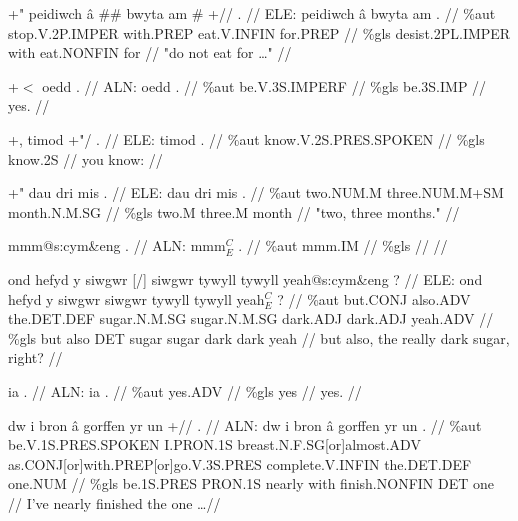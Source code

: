 \documentclass[a4paper,10pt]{article}
\begin{document}
\ex
\begingl[lingstyle=gergl]
\glchat +" peidiwch â \#\# bwyta am \# +// . //
\glsurface ELE:  peidiwch â bwyta am .  //
\glauto \%aut  stop{\scriptsize .V.2P.IMPER} with{\scriptsize .PREP} eat{\scriptsize .V.INFIN} for{\scriptsize .PREP}   //
\glmanual \%gls  desist{\scriptsize .2PL.IMPER} with eat{\scriptsize .NONFIN} for   //
\gleng "do not eat for \dots " //
\endgl
\xe

\ex
\begingl[lingstyle=gergl]
\glchat +$<$ oedd . //
\glsurface ALN:  oedd .  //
\glauto \%aut  be{\scriptsize .V.3S.IMPERF}   //
\glmanual \%gls  be{\scriptsize .3S.IMP}   //
\gleng yes. //
\endgl
\xe

\ex
\begingl[lingstyle=gergl]
\glchat +, timod +"/ . //
\glsurface ELE:  timod .  //
\glauto \%aut  know{\scriptsize .V.2S.PRES.SPOKEN}   //
\glmanual \%gls  know{\scriptsize .2S}   //
\gleng you know: //
\endgl
\xe

\ex
\begingl[lingstyle=gergl]
\glchat +" dau dri mis . //
\glsurface ELE:  dau dri mis .  //
\glauto \%aut  two{\scriptsize .NUM.M} three{\scriptsize .NUM.M+SM} month{\scriptsize .N.M.SG}   //
\glmanual \%gls  two{\scriptsize .M} three{\scriptsize .M} month   //
\gleng "two, three months." //
\endgl
\xe

\ex
\begingl[lingstyle=gergl]
\glchat mmm@s:cym\&eng . //
\glsurface ALN:  mmm$^{C}_{E}$ .  //
\glauto \%aut  mmm{\scriptsize .IM}   //
\glmanual \%gls     //
\gleng  //
\endgl
\xe

\ex
\begingl[lingstyle=gergl]
\glchat ond hefyd y siwgwr [/] siwgwr tywyll tywyll yeah@s:cym\&eng ? //
\glsurface ELE:  ond hefyd y siwgwr siwgwr tywyll tywyll yeah$^{C}_{E}$ ?  //
\glauto \%aut  but{\scriptsize .CONJ} also{\scriptsize .ADV} the{\scriptsize .DET.DEF} sugar{\scriptsize .N.M.SG} sugar{\scriptsize .N.M.SG} dark{\scriptsize .ADJ} dark{\scriptsize .ADJ} yeah{\scriptsize .ADV}   //
\glmanual \%gls  but also DET sugar sugar dark dark yeah   //
\gleng but also, the really dark sugar, right? //
\endgl
\xe

\ex
\begingl[lingstyle=gergl]
\glchat ia . //
\glsurface ALN:  ia .  //
\glauto \%aut  yes{\scriptsize .ADV}   //
\glmanual \%gls  yes   //
\gleng yes. //
\endgl
\xe

\ex
\begingl[lingstyle=gergl]
\glchat dw i bron â gorffen yr un +// . //
\glsurface ALN:  dw i bron â gorffen yr un .  //
\glauto \%aut  be{\scriptsize .V.1S.PRES.SPOKEN} I{\scriptsize .PRON.1S} breast{\scriptsize .N.F.SG[or]almost.ADV} as{\scriptsize .CONJ[or]with.PREP[or]go.V.3S.PRES} complete{\scriptsize .V.INFIN} the{\scriptsize .DET.DEF} one{\scriptsize .NUM}   //
\glmanual \%gls  be{\scriptsize .1S.PRES} PRON{\scriptsize .1S} nearly with finish{\scriptsize .NONFIN} DET one   //
\gleng I've nearly finished the one \dots  //
\endgl
\xe
\end{document}
